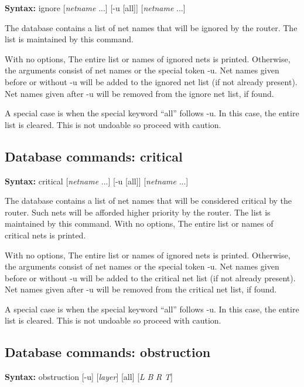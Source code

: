 {\bf Syntax:} {\vt ignore} [{\it netname} ...] [{\vt -u} [{\vt all}]]
 [{\it netname} ...]

The database contains a list of net names that will be ignored by the
router.  The list is maintained by this command.

With no options, The entire list or names of ignored nets is printed. 
Otherwise, the arguments consist of net names or the special token
{\vt -u}.  Net names given before or without {\vt -u} will be added to
the ignored net list (if not already present).  Net names given after
{\vt -u} will be removed from the ignore net list, if found.

A special case is when the special keyword ``{\vt all}'' follows {\vt
-u}.  In this case, the entire list is cleared.  This is not undoable
so proceed with caution.

\subsection{Database commands: {\vt critical}}

{\bf Syntax:} {\vt critical} [{\it netname} ...] [{\vt -u} [{\vt all}]]
 [{\it netname} ...]

The database contains a list of net names that will be considered
critical by the router.  Such nets will be afforded higher priority by
the router.  The list is maintained by this command.  With no options,
The entire list or names of critical nets is printed.

With no options, The entire list or names of ignored nets is printed. 
Otherwise, the arguments consist of net names or the special token
{\vt -u}.  Net names given before or without {\vt -u} will be added to
the critical net list (if not already present).  Net names given after
{\vt -u} will be removed from the critical net list, if found.

A special case is when the special keyword ``{\vt all}'' follows {\vt
-u}.  In this case, the entire list is cleared.  This is not undoable
so proceed with caution.

\subsection{Database commands: {\vt obstruction}}

{\bf Syntax:} {\vt obstruction} [{\vt -u}] [{\it layer}] [{\vt all}]
   [{\it L} {\it B} {\it R} {\it T\/}]

